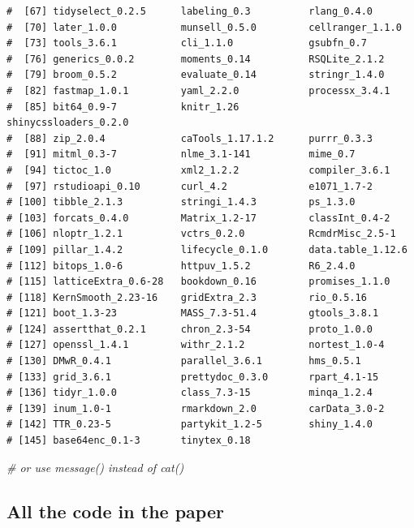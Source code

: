 \documentclass[
  12pt,
]{article}
\newenvironment{Shaded}{\begin{snugshade}}{\end{snugshade}}
\newcommand{\CommentTok}[1]{\textcolor[rgb]{0.56,0.35,0.01}{\textit{#1}}}
\begin{document}
\begin{verbatim}
#  [67] tidyselect_0.2.5      labeling_0.3          rlang_0.4.0           
#  [70] later_1.0.0           munsell_0.5.0         cellranger_1.1.0      
#  [73] tools_3.6.1           cli_1.1.0             gsubfn_0.7            
#  [76] generics_0.0.2        moments_0.14          RSQLite_2.1.2         
#  [79] broom_0.5.2           evaluate_0.14         stringr_1.4.0         
#  [82] fastmap_1.0.1         yaml_2.2.0            processx_3.4.1        
#  [85] bit64_0.9-7           knitr_1.26            shinycssloaders_0.2.0 
#  [88] zip_2.0.4             caTools_1.17.1.2      purrr_0.3.3           
#  [91] mitml_0.3-7           nlme_3.1-141          mime_0.7              
#  [94] tictoc_1.0            xml2_1.2.2            compiler_3.6.1        
#  [97] rstudioapi_0.10       curl_4.2              e1071_1.7-2           
# [100] tibble_2.1.3          stringi_1.4.3         ps_1.3.0              
# [103] forcats_0.4.0         Matrix_1.2-17         classInt_0.4-2        
# [106] nloptr_1.2.1          vctrs_0.2.0           RcmdrMisc_2.5-1       
# [109] pillar_1.4.2          lifecycle_0.1.0       data.table_1.12.6     
# [112] bitops_1.0-6          httpuv_1.5.2          R6_2.4.0              
# [115] latticeExtra_0.6-28   bookdown_0.16         promises_1.1.0        
# [118] KernSmooth_2.23-16    gridExtra_2.3         rio_0.5.16            
# [121] boot_1.3-23           MASS_7.3-51.4         gtools_3.8.1          
# [124] assertthat_0.2.1      chron_2.3-54          proto_1.0.0           
# [127] openssl_1.4.1         withr_2.1.2           nortest_1.0-4         
# [130] DMwR_0.4.1            parallel_3.6.1        hms_0.5.1             
# [133] grid_3.6.1            prettydoc_0.3.0       rpart_4.1-15          
# [136] tidyr_1.0.0           class_7.3-15          minqa_1.2.4           
# [139] inum_1.0-1            rmarkdown_2.0         carData_3.0-2         
# [142] TTR_0.23-5            partykit_1.2-5        shiny_1.4.0           
# [145] base64enc_0.1-3       tinytex_0.18          
\end{verbatim}

\begin{Shaded}
\begin{Highlighting}[]
  \CommentTok{# or use message() instead of cat()}
\end{Highlighting}
\end{Shaded}

\hypertarget{all-the-code-in-the-paper}{%
\subsection{All the code in the paper}\label{all-the-code-in-the-paper}}
\end{document}
